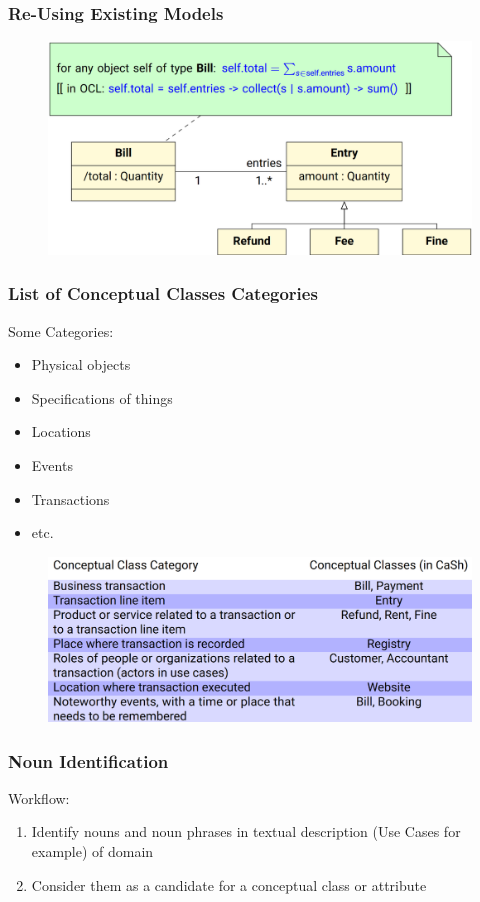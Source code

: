 \documentclass[
../../Software_Engineering_Summary.tex,
]
{subfiles}
\begin{document}
\subsubsection{Re-Using Existing Models}
\begin{figure}[htp]
    \centering
    \includegraphics[scale=0.4]{Pics/04/ReUsingConceptualClasses.png}
\end{figure}

\subsubsection{List of Conceptual Classes Categories}
Some Categories:
\begin{itemize}
    \item Physical objects
    \item Specifications of things
    \item Locations
    \item Events
    \item Transactions
    \item etc.
\end{itemize}
\begin{figure}[htp]
    \centering
    \includegraphics[scale=0.5]{Pics/04/CategoryListExample.png}
\end{figure}

\newpage
\subsubsection{Noun Identification}
Workflow:
\begin{enumerate}
    \item Identify nouns and noun phrases in textual description (Use Cases for example) of domain
    \item Consider them as a candidate for a conceptual class or attribute
\end{enumerate}
\end{document}
